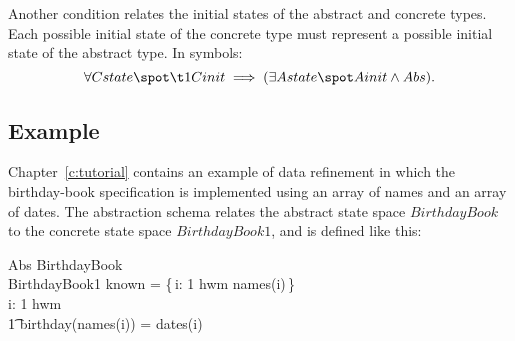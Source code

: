 Another condition relates the initial states of the abstract and
concrete types. Each possible initial state of the concrete type must
represent a possible initial state of the abstract type. In symbols:
\[
	\forall Cstate \spot \\
\t1	    Cinit \implies (\exists Astate \spot Ainit \land Abs).
\]

\subsection*{Example}

\new Chapter~\ref{c:tutorial} contains an example of data refinement
in which the birthday-book specification is implemented using an
array of names and an array of dates.  The abstraction schema
relates the abstract state space $BirthdayBook$ to the concrete
state space $BirthdayBook1$, and is defined like this:
\begin{schema}{Abs}
	BirthdayBook \\
	BirthdayBook1
\where
	known = \{\,i: 1 \upto hwm \spot names(i)\,\} \\
\also
	\forall i: 1 \upto hwm \spot \\
\t1		birthday(names(i)) = dates(i)
\end{schema}

